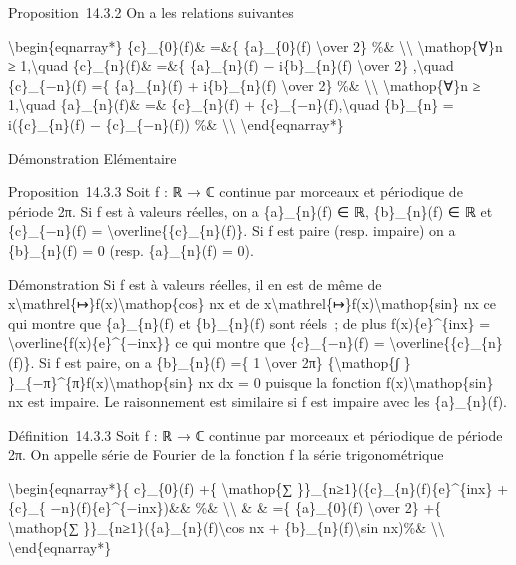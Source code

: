 \documentclass[]{article}
\begin{document}
Proposition~14.3.2 On a les relations suivantes

\textbackslash{}begin\{eqnarray*\} \{c\}\_\{0\}(f)\& =\&\{
\{a\}\_\{0\}(f) \textbackslash{}over 2\} \%\&
\textbackslash{}\textbackslash{} \textbackslash{}mathop\{∀\}n ≥
1,\textbackslash{}quad \{c\}\_\{n\}(f)\& =\&\{ \{a\}\_\{n\}(f) −
i\{b\}\_\{n\}(f) \textbackslash{}over 2\} ,\textbackslash{}quad
\{c\}\_\{−n\}(f) =\{ \{a\}\_\{n\}(f) + i\{b\}\_\{n\}(f)
\textbackslash{}over 2\} \%\& \textbackslash{}\textbackslash{}
\textbackslash{}mathop\{∀\}n ≥ 1,\textbackslash{}quad \{a\}\_\{n\}(f)\&
=\& \{c\}\_\{n\}(f) + \{c\}\_\{−n\}(f),\textbackslash{}quad \{b\}\_\{n\}
= i(\{c\}\_\{n\}(f) − \{c\}\_\{−n\}(f)) \%\&
\textbackslash{}\textbackslash{} \textbackslash{}end\{eqnarray*\}

Démonstration Elémentaire

Proposition~14.3.3 Soit f : ℝ → ℂ continue par morceaux et périodique de
période 2π. Si f est à valeurs réelles, on a \{a\}\_\{n\}(f) ∈ ℝ,
\{b\}\_\{n\}(f) ∈ ℝ et \{c\}\_\{−n\}(f) =
\textbackslash{}overline\{\{c\}\_\{n\}(f)\}. Si f est paire (resp.
impaire) on a \{b\}\_\{n\}(f) = 0 (resp. \{a\}\_\{n\}(f) = 0).

Démonstration Si f est à valeurs réelles, il en est de même de
x\textbackslash{}mathrel\{↦\}f(x)\textbackslash{}mathop\{cos\} nx et de
x\textbackslash{}mathrel\{↦\}f(x)\textbackslash{}mathop\{sin\} nx ce qui
montre que \{a\}\_\{n\}(f) et \{b\}\_\{n\}(f) sont réels~; de plus
f(x)\{e\}\^{}\{inx\} = \textbackslash{}overline\{f(x)\{e\}\^{}\{−inx\}\}
ce qui montre que \{c\}\_\{−n\}(f) =
\textbackslash{}overline\{\{c\}\_\{n\}(f)\}. Si f est paire, on a
\{b\}\_\{n\}(f) =\{ 1 \textbackslash{}over 2π\}
\{\textbackslash{}mathop\{∫ \}
\}\_\{−π\}\^{}\{π\}f(x)\textbackslash{}mathop\{sin\} nx dx = 0 puisque
la fonction f(x)\textbackslash{}mathop\{sin\} nx est impaire. Le
raisonnement est similaire si f est impaire avec les \{a\}\_\{n\}(f).

Définition~14.3.3 Soit f : ℝ → ℂ continue par morceaux et périodique de
période 2π. On appelle série de Fourier de la fonction f la série
trigonométrique

\textbackslash{}begin\{eqnarray*\}\{ c\}\_\{0\}(f) +\{
\textbackslash{}mathop\{∑ \}\}\_\{n≥1\}(\{c\}\_\{n\}(f)\{e\}\^{}\{inx\}
+ \{c\}\_\{ −n\}(f)\{e\}\^{}\{−inx\})\&\& \%\&
\textbackslash{}\textbackslash{} \& \& =\{ \{a\}\_\{0\}(f)
\textbackslash{}over 2\} +\{ \textbackslash{}mathop\{∑
\}\}\_\{n≥1\}(\{a\}\_\{n\}(f)\textbackslash{}cos nx +
\{b\}\_\{n\}(f)\textbackslash{}sin nx)\%\&
\textbackslash{}\textbackslash{} \textbackslash{}end\{eqnarray*\}
\end{document}
